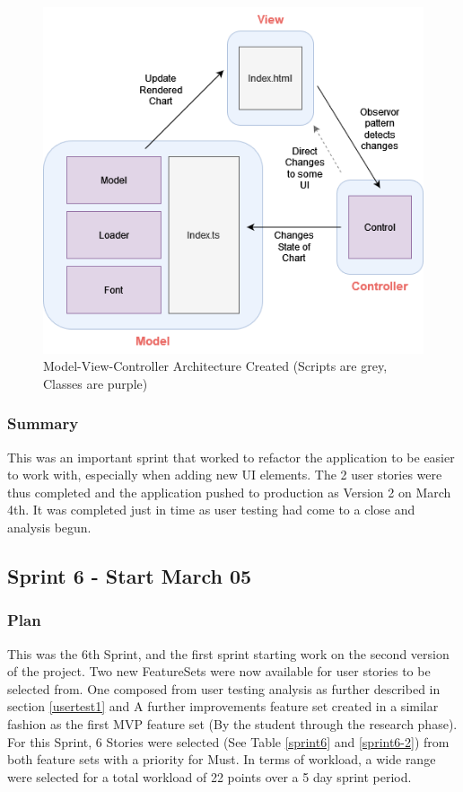 \begin{figure}[h]
    \centering
    \includegraphics[width=1\columnwidth]{author-files/figures/MVC.png}
    \caption{Model-View-Controller Architecture Created (Scripts are grey, Classes are purple)}
    \label{fig:mvc}
\end{figure}

\subsubsection{Summary}
This was an important sprint that worked to refactor the application to be easier to work with, especially when adding new UI elements.
The 2 user stories were thus completed and the application pushed to production as Version 2 on March 4th.
It was completed just in time as user testing had come to a close and analysis begun.

\subsection{Sprint 6 - Start March 05}
\subsubsection{Plan}
This was the 6th Sprint, and the first sprint starting work on the second version of the project. Two new FeatureSets were now available for user stories to be selected from. One composed from user testing analysis as further described in section \ref{usertest1} and A further improvements feature set created in a similar fashion as the first MVP feature set (By the student through the research phase). For this Sprint, 6 Stories were selected (See Table \ref{sprint6} and \ref{sprint6-2}) from both feature sets with a priority for Must. In terms of workload, a wide range were selected for a total workload of 22 points over a 5 day sprint period.

